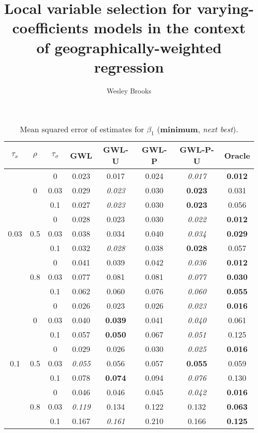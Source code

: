 \documentclass[authoryear, review, 11pt]{elsarticle}
\title{Local variable selection for varying-coefficients models in the context of geographically-weighted regression}
\author{Wesley Brooks}
\date{}                                           %
\begin{document}
\begin{table}[ht]
\begin{center}
\begin{tabular}{ccc | ccccc}
$\tau_x$ & $\rho$ & $\tau_\sigma$ &  GWL & GWL-U & GWL-P & GWL-P-U & Oracle \\ 
  \hline
\multirow{9}{*}{0.03} & \multirow{3}{*}{0} & 0 & 0.023 & 0.017 & 0.024 & \emph{0.017} & \textbf{0.012} \\ 
 &  & 0.03 &   0.029 & \emph{0.023} & 0.030 & \textbf{0.023} & 0.031 \\ 
 &  & 0.1 &   0.027 & \emph{0.023} & 0.030 & \textbf{0.023} & 0.056 \\ \cline{2-8}
 & \multirow{3}{*}{0.5} & 0 &   0.028 & 0.023 & 0.030 & \emph{0.022} & \textbf{0.012} \\ 
 &  & 0.03 &   0.038 & 0.034 & 0.040 & \emph{0.034} & \textbf{0.029} \\ 
 &  & 0.1 &   0.032 & \emph{0.028} & 0.038 & \textbf{0.028} & 0.057 \\ \cline{2-8}
 & \multirow{3}{*}{0.8} & 0 &   0.041 & 0.039 & 0.042 & \emph{0.036} & \textbf{0.012} \\ 
 &  & 0.03 &   0.077 & 0.081 & 0.081 & \emph{0.077} & \textbf{0.030} \\ 
 &  & 0.1 &   0.062 & 0.060 & 0.076 & \emph{0.060} & \textbf{0.055} \\ \cline{1-8}
\multirow{9}{*}{0.1} & \multirow{3}{*}{0} & 0 &   0.026 & 0.023 & 0.026 & \emph{0.023} & \textbf{0.016} \\ 
 &  & 0.03 &   0.040 & \textbf{0.039} & 0.041 & \emph{0.040} & 0.061 \\ 
 &  & 0.1 &   0.057 & \textbf{0.050} & 0.067 & \emph{0.051} & 0.125 \\ \cline{2-8}
 & \multirow{3}{*}{0.5} & 0 &   0.029 & 0.026 & 0.030 & \emph{0.025} & \textbf{0.016} \\ 
 &  & 0.03 &   \emph{0.055} & 0.056 & 0.057 & \textbf{0.055} & 0.059 \\ 
 &  & 0.1 &   0.078 & \textbf{0.074} & 0.094 & \emph{0.076} & 0.130 \\ \cline{2-8}
 & \multirow{3}{*}{0.8} & 0 &   0.046 & 0.046 & 0.045 & \emph{0.042} & \textbf{0.016} \\ 
 &  & 0.03 &   \emph{0.119} & 0.134 & 0.122 & 0.132 & \textbf{0.063} \\ 
 &  & 0.1 &   0.167 & \emph{0.161} & 0.210 & 0.166 & \textbf{0.125} \\ 
  \end{tabular}
\caption{Mean squared error of estimates for $\beta_1$ (\textbf{minimum}, \emph{next best}).\label{MSEX}}
\end{center}
\end{table}
\end{document}
